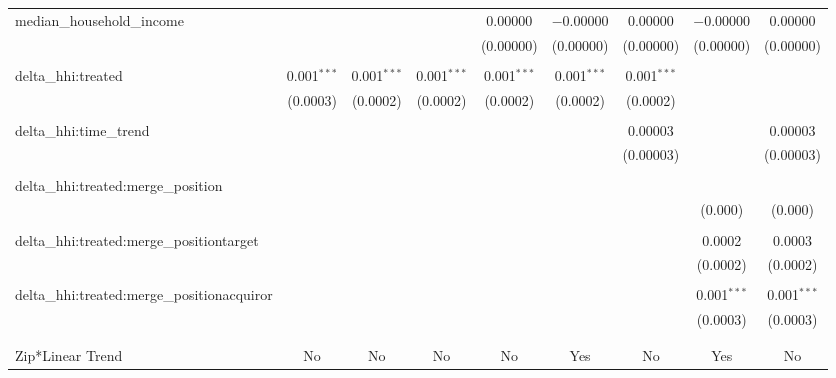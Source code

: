 \begin{table}[H]
{\begin{tabular}{@{\extracolsep{5pt}}lcccccccc}
  median\_household\_income &  &  &  & 0.00000 & $-$0.00000 & 0.00000 & $-$0.00000 & 0.00000 \\  

   &  &  &  & (0.00000) & (0.00000) & (0.00000) & (0.00000) & (0.00000) \\  

   & & & & & & & & \\  

  delta\_hhi:treated & 0.001$^{***}$ & 0.001$^{***}$ & 0.001$^{***}$ & 0.001$^{***}$ & 0.001$^{***}$ & 0.001$^{***}$ &  &  \\  

   & (0.0003) & (0.0002) & (0.0002) & (0.0002) & (0.0002) & (0.0002) &  &  \\  

   & & & & & & & & \\  

  delta\_hhi:time\_trend &  &  &  &  &  & 0.00003 &  & 0.00003 \\  

   &  &  &  &  &  & (0.00003) &  & (0.00003) \\  

   & & & & & & & & \\  

  delta\_hhi:treated:merge\_position &  &  &  &  &  &  &  &  \\  

   &  &  &  &  &  &  & (0.000) & (0.000) \\  

   & & & & & & & & \\  

  delta\_hhi:treated:merge\_positiontarget &  &  &  &  &  &  & 0.0002 & 0.0003 \\  

   &  &  &  &  &  &  & (0.0002) & (0.0002) \\  

   & & & & & & & & \\  

  delta\_hhi:treated:merge\_positionacquiror &  &  &  &  &  &  & 0.001$^{***}$ & 0.001$^{***}$ \\  

   &  &  &  &  &  &  & (0.0003) & (0.0003) \\  

   & & & & & & & & \\  

 \hline \\[-1.8ex]  

 Zip*Linear Trend & No & No & No & No & Yes & No & Yes & No \\  


\end{tabular}}
\end{table}
